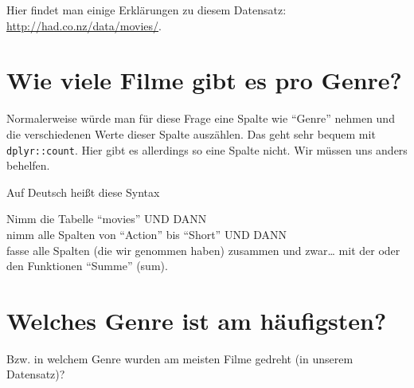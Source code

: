 \documentclass[12pt,ngerman,]{book}
\makeatletter
\newenvironment{Shaded}{\begin{snugshade}}{\end{snugshade}}
\newcommand{\KeywordTok}[1]{\textcolor[rgb]{0.13,0.29,0.53}{\textbf{{#1}}}}
\newcommand{\StringTok}[1]{\textcolor[rgb]{0.31,0.60,0.02}{{#1}}}
\newcommand{\CommentTok}[1]{\textcolor[rgb]{0.56,0.35,0.01}{\textit{{#1}}}}
\newcommand{\NormalTok}[1]{{#1}}
\newenvironment{kframe}{%
\medskip{}
\setlength{\fboxsep}{.8em}
 \def\at@end@of@kframe{}%
 \ifinner\ifhmode%
  \def\at@end@of@kframe{\end{minipage}}%
  \begin{minipage}{\columnwidth}%
 \fi\fi%
 \def\FrameCommand##1{\hskip\@totalleftmargin \hskip-\fboxsep
 \colorbox{shadecolor}{##1}\hskip-\fboxsep
     \hskip-\linewidth \hskip-\@totalleftmargin \hskip\columnwidth}%
 \MakeFramed {\advance\hsize-\width
   \@totalleftmargin\z@ \linewidth\hsize
   \@setminipage}}%
 {\par\unskip\endMakeFramed%
 \at@end@of@kframe}
\renewenvironment{Shaded}{\begin{kframe}}{\end{kframe}}
\let\BeginKnitrBlock\begin \let\EndKnitrBlock\end
\makeatother
\begin{document}
Hier findet man einige Erklärungen zu diesem Datensatz:
\url{http://had.co.nz/data/movies/}.

\section{Wie viele Filme gibt es pro
Genre?}\label{wie-viele-filme-gibt-es-pro-genre}

Normalerweise würde man für diese Frage eine Spalte wie ``Genre'' nehmen
und die verschiedenen Werte dieser Spalte auszählen. Das geht sehr
bequem mit \texttt{dplyr::count}. Hier gibt es allerdings so eine Spalte
nicht. Wir müssen uns anders behelfen.

\begin{Shaded}
\end{Shaded}

Auf Deutsch heißt diese Syntax

\BeginKnitrBlock{rmdpseudocode}
Nimm die Tabelle ``movies'' UND DANN\\
nimm alle Spalten von ``Action'' bis ``Short'' UND DANN\\
fasse alle Spalten (die wir genommen haben) zusammen und zwar\ldots{}
mit der oder den Funktionen ``Summe'' (sum).
\EndKnitrBlock{rmdpseudocode}

\section{Welches Genre ist am
häufigsten?}\label{welches-genre-ist-am-haufigsten}

Bzw. in welchem Genre wurden am meisten Filme gedreht (in unserem
Datensatz)?

\begin{Shaded}
\end{Shaded}
\end{document}
